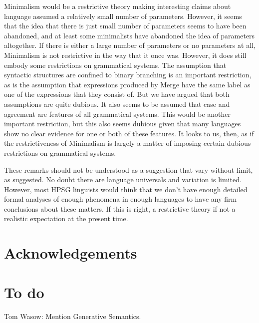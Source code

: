 \documentclass[output=paper]{langsci/langscibook}
\begin{document}
Minimalism would be a restrictive theory making interesting claims about language assumed a
relatively small number of parameters. However, it seems that the idea that there is just small
number of parameters seems to have been abandoned, and at least some minimalists have abandoned the
idea of parameters altogether. If there is either a large number of parameters or no parameters at
all, Minimalism is not restrictive in the way that it once was. However, it does still embody some
restrictions on grammatical systems. The assumption that syntactic structures are confined to binary
branching is an important restriction, as is the assumption that expressions produced by Merge have
the same label as one of the expressions that they consist of. But we have argued that both
assumptions are quite dubious. It also seems to be assumed that case and agreement are features of
all grammatical systems. This would be another important restriction, but this also seems dubious
given that many languages show no clear evidence for one or both of these features. It looks to us,
then, as if the restrictiveness of Minimalism is largely a matter of imposing certain dubious
restrictions on grammatical systems.

These remarks should not be understood as a suggestion that vary without limit, as
\citet[]{Joos58a-u} suggested. No doubt there are language universals and variation
is limited. However, most HPSG linguists would think that we don’t have enough detailed formal
analyses of enough phenomena in enough languages to have any firm conclusions about these matters.
If this is right, a restrictive theory if not a realistic expectation at the present time.




\section*{Acknowledgements}

\section{To do}


Tom Wasow: Mention Generative Semantics.

{\sloppy 
\printbibliography[heading=subbibliography,notkeyword=this] 
}
\end{document}
